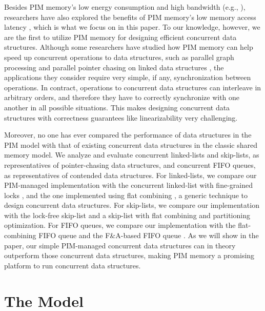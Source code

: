 \documentclass[11pt]{article}
\begin{document}
Besides PIM memory's low energy consumption and high bandwidth 
(e.g., \cite{Ahn2015:2, Zhang2014:TTP, ZhuASSHPF13, AzarkhishPRLB17}), 
researchers have also explored the benefits of PIM memory's low memory access latency
\cite{Loh2008, hsieh2016accelerating, Azarkhish16}, which is what we focus on in this paper. 
To our knowledge, however, we are the first to utilize PIM memory for designing efficient 
concurrent data structures. 
Although some researchers have studied how PIM memory can help speed up concurrent 
operations to data structures, such as parallel graph processing \cite{Ahn2015:2} and  
parallel pointer chasing on linked data structures \cite{hsieh2016accelerating}, 
the applications they consider require very simple, if any, synchronization between operations. 
In contract, operations to concurrent data structures can interleave in arbitrary orders, 
and therefore they have to correctly synchronize with one another in all possible situations. 
This makes designing concurrent data structures with correctness guarantees like 
linearizability \cite{Herlihy90} very challenging. 

Moreover, no one has ever compared the performance of data structures in the PIM model 
with that of existing concurrent data structures in the classic shared memory model. 
We analyze and evaluate concurrent linked-lists and skip-lists, 
as representatives of pointer-chasing data structures, and concurrent FIFO queues, 
as representatives of contended data structures.
For linked-lists, we compare our PIM-managed implementation with the concurrent linked-list with 
fine-grained locks \cite{Heller05}, and the one implemented using flat combining 
\cite{Hendler10}, a generic technique to design concurrent data structures.  
For skip-lists, we compare our implementation with the lock-free skip-list \cite{Herlihy08} 
and a skip-list with flat combining and partitioning optimization. 
For FIFO queues, we compare our implementation with the flat-combining FIFO queue 
\cite{Hendler10} and the F\&A-based FIFO queue \cite{Morrison13}.  
As we will show in the paper, our simple PIM-managed concurrent data structures can in theory 
outperform those concurrent data structures, 
making PIM memory a promising platform to run concurrent data structures.



\section{The Model}
\label{section:model}
\end{document}
